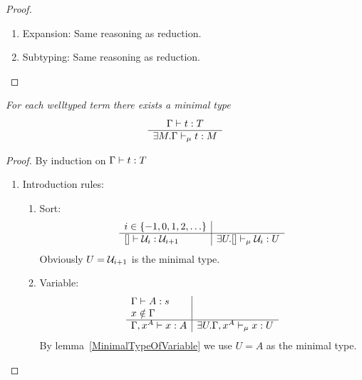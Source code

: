 \begin{lemma}
\begin{proof}
\begin{enumerate}
\begin{enumerate}
                \item Expansion: Same reasoning as reduction.

                \item Subtyping: Same reasoning as reduction.
            \end{enumerate}
        \end{enumerate}
    \end{proof}
\end{lemma}



\begin{theorem}
    \label{MinimalType}
    \emph{For each welltyped term there exists a minimal type}
    $$
    \begin{array}{c} 
        \Gamma \vdash t: T
     \\ \hline 
        \exists M. \Gamma \vdash_\mu t: M
    \end{array}
    $$

    \begin{proof} By induction on $\Gamma \vdash t: T$
        \begin{enumerate}
            \item Introduction rules:
            \begin{enumerate}
                \item Sort:
                    $$
                    \begin{array}{l|l}
                        i \in {\{-1, 0, 1, 2, \ldots\}}
                        \\
                        \hline
                        [] \vdash {\cal U}_i : {\cal U}_{i+1}
                        &
                        \exists U. [] \vdash_\mu {\cal U}_i: U
                    \end{array}
                    $$
                    Obviously $U = {\cal U}_{i+1}$ is the minimal type.

                \item Variable:
                    $$
                    \begin{array}{l|l}
                        \Gamma \vdash A : s
                        \\
                        x \notin \Gamma
                        \\
                        \hline
                        \Gamma, x^A \vdash x : A
                        &
                        \exists U. \Gamma, x^A \vdash_\mu x: U
                    \end{array}
                    $$
                    By lemma~\ref{MinimalTypeOfVariable} we use $U =A$ as the
                    minimal type.


\end{enumerate}
\end{enumerate}
\end{proof}
\end{theorem}
